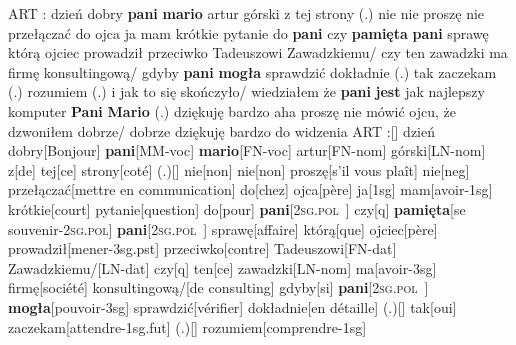 \documentclass[12pt,a4paper,french]{book}
\newcommand{\pv}{\textsc{2sg.pol}}
\begin{document}

\leavevmode
\vskip5.9in

\ex[everyglpreamble=\tt,glhangstyle=none,glspace=1.5em minus .5em,
   glnabovelineskip={,-6pt},glrightskip=0pt plus 10em]
%
\raggedbottom
\begingl
\glpreamble
ART : dzień dobry \\{pani} \\{mario} artur
górski z tej strony (.) nie nie proszę nie przełączać do ojca ja mam
krótkie pytanie do \\{pani} czy \\{pamięta} \\{pani}
sprawę którą ojciec prowadził przeciwko Tadeuszowi Zawadzkiemu/ czy ten
zawadzki ma firmę konsultingową/ gdyby \\{pani} \\{mogła}
sprawdzić dokładnie (.) tak zaczekam (.) rozumiem (.) i jak to się
skończyło/ wiedziałem że \\{pani} \\{jest} jak najlepszy
komputer \\{Pani} \\{Mario} (.) dziękuję bardzo aha proszę
nie mówić ojcu, że dzwoniłem dobrze/ dobrze dziękuję bardzo do widzenia
\endpreamble
{ART :}[{}]   {dzień dobry}[Bonjour]   \\{pani}[MM-{\sc voc}]
\\{mario}[FN-{\sc voc}]   artur[FN-{\sc nom}]   górski[LN-{\sc nom}]
z[de] tej[ce]   strony[coté]   {(.)}[{}]   nie[non]   nie[non]
proszę[{s'il vous plaît}]   nie[{\sc neg}]
przełączać[{mettre en communication}]   do[chez]
ojca[père] ja[{\sc 1sg}]   mam[avoir-{\sc 1sg}]   krótkie[court]
pytanie[question]   do[pour]   \\{pani}[\pv~]   czy[{\sc q}]
\\{pamięta}[{se souvenir-\pv}]   \\{pani}[\pv~]
sprawę[affaire]   którą[que]   ojciec[père]
prowadził[mener-{\sc 3sg.pst}]   przeciwko[contre]   Tadeuszowi[FN-{\sc dat}]
Zawadzkiemu/[LN-{\sc dat}]   czy[{\sc q}]   ten[ce]   zawadzki[LN-{\sc nom}]
ma[avoir-{\sc 3sg}]   firmę[société]   konsultingową/[{de consulting}]
gdyby[si]   \\{pani}[\pv~]   \\{mogła}[pouvoir-{\sc 3sg}]
sprawdzić[vérifier]   dokładnie[{en détaille}]   {(.)}[{}]   tak[oui]
zaczekam[attendre-{\sc 1sg.fut}]   {(.)}[{}] rozumiem[comprendre-{\sc 1sg}]
\end{document}
